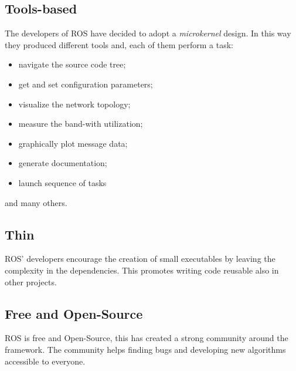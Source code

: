 \documentclass[../thesis.tex]{subfiles}
\begin{document}
\subsection{Tools-based}
The developers of \gls{ROS} have decided to adopt a \textit{microkernel} design. In this way they produced different tools and, each of them perform a task:
\begin{itemize}
    \item navigate the source code tree;
    \item get and set configuration parameters;
    \item visualize the network topology;
    \item measure the band-with utilization;
    \item graphically plot message data;
    \item generate documentation;
    \item launch sequence of tasks
\end{itemize}
and many others.

\subsection{Thin}
\gls{ROS}' developers encourage the creation of small executables by leaving the complexity in the dependencies. This promotes writing code reusable also in other projects.

\subsection{Free and Open-Source}
\gls{ROS} is free and Open-Source, this has created a strong community around the framework. The community helps finding bugs and developing new algorithms accessible to everyone.
\end{document}
